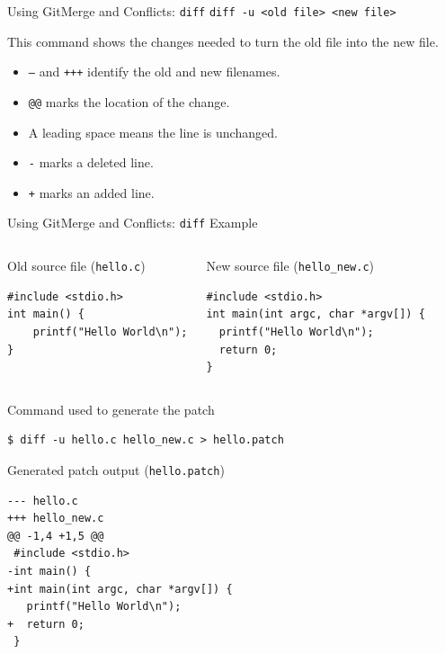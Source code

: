 \documentclass[10pt,compress]{beamer}
\begin{document}
\begin{frame}{Using Git}{Merge and Conflicts: \texttt{diff}}
\texttt{diff -u <old file> <new file>}

\bigskip

This command shows the changes needed to turn the old file into the new file.

\begin{itemize}
 \item \texttt{---} and \texttt{+++} identify the old and new filenames.
 \item \texttt{@@} marks the location of the change.
 \item A leading space means the line is unchanged.
 \item \texttt{-} marks a deleted line.
 \item \texttt{+} marks an added line.
\end{itemize}
\end{frame}

\begin{frame}[fragile,shrink=5]{Using Git}{Merge and Conflicts: \texttt{diff} Example}
\begin{scriptsize}
\begin{columns}
\begin{block}{Old source file (\texttt{hello.c})}
\begin{verbatim}
#include <stdio.h>
int main() {
    printf("Hello World\n");
}
\end{verbatim}
\end{block}
\begin{block}{New source file (\texttt{hello\_new.c})}
\begin{verbatim}
#include <stdio.h>
int main(int argc, char *argv[]) {
  printf("Hello World\n");
  return 0;
}
\end{verbatim}
\end{block}
\end{columns}

\begin{alertblock}{Command used to generate the patch}
\begin{verbatim}
$ diff -u hello.c hello_new.c > hello.patch
\end{verbatim}
\end{alertblock}

\begin{exampleblock}{Generated patch output (\texttt{hello.patch})}
\begin{verbatim}
--- hello.c
+++ hello_new.c
@@ -1,4 +1,5 @@
 #include <stdio.h>
-int main() {
+int main(int argc, char *argv[]) {
   printf("Hello World\n");
+  return 0;
 }
\end{verbatim}
\end{exampleblock}
\end{scriptsize}
\end{frame}
\end{document}
